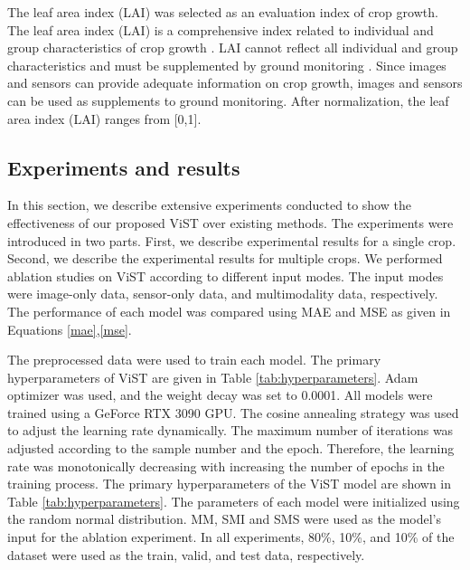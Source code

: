 \documentclass[acmsmall,manuscript, screen, review]{acmart}
\begin{document}
The leaf area index (LAI) was selected as an evaluation index of crop growth. The leaf area index (LAI) is a comprehensive index related to individual and group characteristics of crop growth \cite{__1999}. LAI cannot reflect all individual and group characteristics and must be supplemented by ground monitoring \cite{carlson_relation_1997}. Since images and sensors can provide adequate information on crop growth, images and sensors can be used as supplements to ground monitoring. After normalization, the leaf area index (LAI) ranges from [0,1].

\subsection{Experiments and results}
In this section, we describe extensive experiments conducted to show the effectiveness of our proposed ViST over existing methods. The experiments were introduced in two parts. First, we describe experimental results for a single crop. Second, we describe the experimental results for multiple crops. We performed ablation studies on ViST according to different input modes. The input modes were image-only data, sensor-only data, and multimodality data, respectively. The performance of each model was compared using MAE and MSE as given in Equations \ref{mae},\ref{mse}. 

The preprocessed data were used to train each model. The primary hyperparameters of ViST are given in Table \ref{tab:hyperparameters}. Adam optimizer was used, and the weight decay was set to 0.0001. All models were trained using a GeForce RTX 3090 GPU. The cosine annealing strategy was used to adjust the learning rate dynamically. The maximum number of iterations was adjusted according to the sample number and the epoch. Therefore, the learning rate was monotonically decreasing with increasing the number of epochs in the training process. The primary hyperparameters of the ViST model are shown in Table \ref{tab:hyperparameters}.  The parameters of each model were initialized using the random normal distribution. MM, SMI and SMS were used as the model's input for the ablation experiment. In all experiments, 80\%, 10\%, and 10\% of the dataset were used as the train, valid, and test data, respectively.
\end{document}
